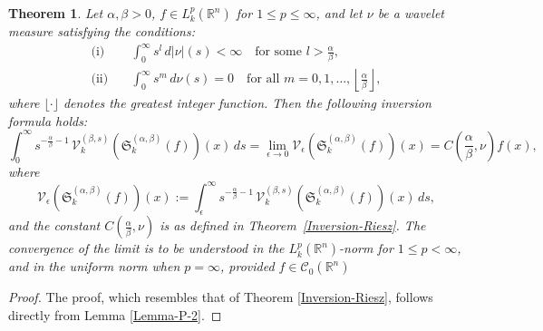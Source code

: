 \documentclass[11pt,a4paper,reqno]{amsproc}
\newtheorem{theorem}{Theorem}[section]
\theoremstyle{definition}
\theoremstyle{remark}
\numberwithin{equation}{section}
\begin{document}
\begin{theorem} \label{Thrm-Inversion of beta}
 Let \( \alpha, \beta > 0 \), \( f \in L_k^p(\mathbb{R}^n) \) for \( 1 \leq p \leq \infty \), and let \( \nu \) be a wavelet measure satisfying the conditions:
\begin{align*}
\text{(i)} & \quad \int_0^\infty s^{l} \, d|\nu|(s) < \infty \quad \text{for some } l > \frac{\alpha}{\beta}, \\
\text{(ii)} & \quad \int_0^\infty s^m \, d\nu(s) = 0 \quad \text{for all } m = 0, 1, \ldots, \left\lfloor \frac{\alpha}{\beta} \right\rfloor,
\end{align*}
where \( \lfloor \cdot \rfloor \) denotes the greatest integer function. Then the following inversion formula holds:
\[
\int_0^\infty s^{-\frac{\alpha}{\beta}-1} \, \mathcal{V}_k^{(\beta,s)}\left( \mathfrak{S}_k^{(\alpha, \beta)}(f) \right)(x) \, ds 
= \lim_{\epsilon \to 0} \mathcal{V}_\epsilon\left( \mathfrak{S}_k^{(\alpha, \beta)}(f) \right)(x) 
= C\left(\frac{\alpha}{\beta}, \nu\right) f(x),
\]
where
\[
\mathcal{V}_\epsilon\left( \mathfrak{S}_k^{(\alpha, \beta)}(f) \right)(x) := \int_\epsilon^\infty s^{-\frac{\alpha}{\beta}-1} \, \mathcal{V}_k^{(\beta,s)}\left( \mathfrak{S}_k^{(\alpha, \beta)}(f) \right)(x) \, ds,
\]
and the constant \( C\left( \frac{\alpha}{\beta}, \nu \right) \) is as defined in Theorem~\ref{Inversion-Riesz}. The convergence of the limit is to be understood in the \( L_k^p(\mathbb{R}^n) \)-norm for \( 1 \leq p < \infty \), and in the uniform norm when \( p = \infty \), provided \( f \in \mathcal{C}_0(\mathbb{R}^n) \)
\end{theorem}
\begin{proof}The proof, which resembles that of Theorem \ref{Inversion-Riesz}, follows directly from Lemma \ref{Lemma-P-2}.
\end{proof}
\end{document}
